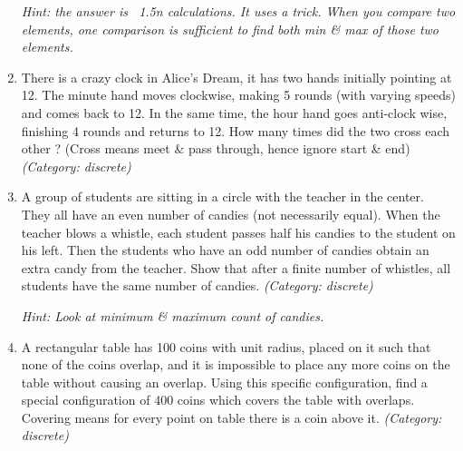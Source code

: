 \begin{enumerate}
\small\emph{Hint: the answer is ~1.5n calculations. It uses a trick. When you compare two elements, one comparison is sufficient to find both min \& max of those two elements.}





\item There is a crazy clock in Alice's Dream, it has two hands initially pointing at 12. The minute hand moves clockwise, making 5 rounds (with varying speeds) and comes back to 12. In the same time, the hour hand goes anti-clock wise, finishing 4 rounds and returns to 12. How many times did the two cross each other ? (Cross means meet \& pass through, hence ignore start \& end)
\small\emph{(Category: discrete)}




\item A group of students are sitting in a circle with the teacher in the center. They all have an even number of candies (not necessarily equal). When the teacher blows a whistle, each student passes half his candies to the student on his left. Then the students who have an odd number of candies obtain an extra candy from the teacher. Show that after a finite number of whistles, all students have the same number of candies.
\small\emph{(Category: discrete)}

\small\emph{Hint: Look at minimum \& maximum count of candies.}





\item A rectangular table has 100 coins with unit radius, placed on it such that none of the coins overlap, and it is impossible to place any more coins on the table without causing an overlap. Using this specific configuration, find a special configuration of 400 coins which covers the table with overlaps.
Covering means for every point on table there is a coin above it.
\small\emph{(Category: discrete)}


\end{enumerate}

